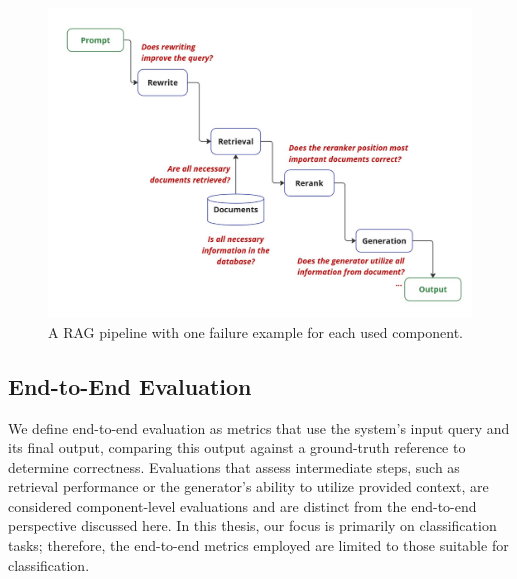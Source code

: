 \begin{figure}
  \centering
  \includegraphics[width=\textwidth]{images/FailurePointExamples.pdf}
  \caption{A RAG pipeline with one failure example for each used component.}
  \label{fig:failures}
\end{figure}

\subsection{End-to-End Evaluation}\label{sec:e2e}

We define end-to-end evaluation as metrics that use the system's input query and its final output, comparing this output against a ground-truth reference to determine correctness. Evaluations that assess intermediate steps, such as retrieval performance or the generator's ability to utilize provided context, are considered component-level evaluations and are distinct from the end-to-end perspective discussed here. In this thesis, our focus is primarily on classification tasks; therefore, the end-to-end metrics employed are limited to those suitable for classification.

